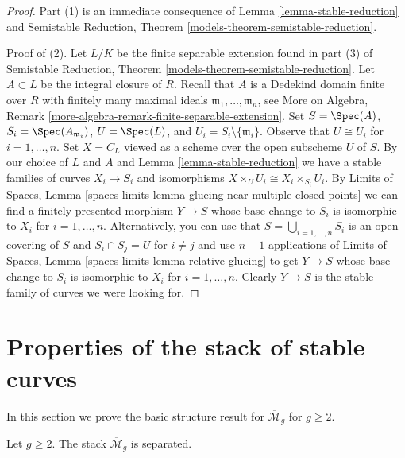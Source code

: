 \begin{proof}
Part (1) is an immediate consequence of Lemma \ref{lemma-stable-reduction} and
Semistable Reduction, Theorem \ref{models-theorem-semistable-reduction}.

\medskip\noindent
Proof of (2). Let $L/K$ be the finite separable extension found in part (3) of
Semistable Reduction, Theorem \ref{models-theorem-semistable-reduction}.
Let $A \subset L$ be the integral closure of $R$.
Recall that $A$ is a Dedekind domain finite over $R$ with
finitely many maximal ideals $\mathfrak m_1, \ldots, \mathfrak m_n$, see
More on Algebra, Remark \ref{more-algebra-remark-finite-separable-extension}.
Set $S = \Spec(A)$, $S_i = \Spec(A_{\mathfrak m_i})$,
$U = \Spec(L)$, and $U_i = S_i \setminus \{\mathfrak m_i\}$.
Observe that $U \cong U_i$ for $i = 1, \ldots, n$.
Set $X = C_L$ viewed as a scheme over the open subscheme $U$ of $S$.
By our choice of $L$ and $A$ and Lemma \ref{lemma-stable-reduction}
we have a stable families of curves $X_i \to S_i$ and isomorphisms
$X \times_U U_i \cong X_i \times_{S_i} U_i$.
By Limits of Spaces, Lemma
\ref{spaces-limits-lemma-glueing-near-multiple-closed-points}
we can find a finitely presented morphism $Y \to S$
whose base change to $S_i$ is isomorphic to $X_i$ for $i = 1, \ldots, n$.
Alternatively, you can use that $S = \bigcup_{i = 1, \ldots, n} S_i$
is an open covering of $S$ and $S_i \cap S_j = U$ for $i \not = j$
and use $n - 1$ applications of
Limits of Spaces, Lemma \ref{spaces-limits-lemma-relative-glueing}
to get $Y \to S$ whose
base change to $S_i$ is isomorphic to $X_i$ for $i = 1, \ldots, n$.
Clearly $Y \to S$ is the stable family of curves we were looking for.
\end{proof}






\section{Properties of the stack of stable curves}
\label{section-properties-stable}

\noindent
In this section we prove the basic structure result for
$\overline{\mathcal{M}}_g$ for $g \geq 2$.

\begin{lemma}
\label{lemma-stable-separated}
Let $g \geq 2$. The stack $\overline{\mathcal{M}}_g$ is separated.
\end{lemma}

